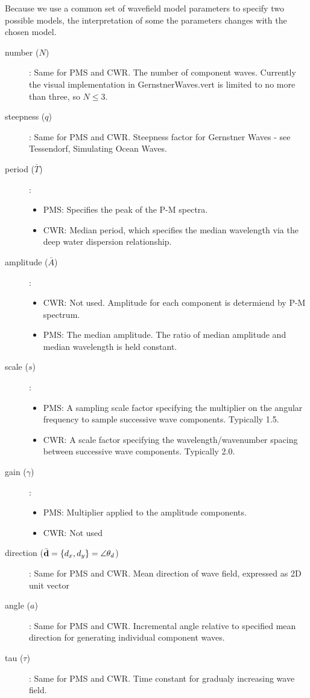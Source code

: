 \documentclass[11pt]{article}
\begin{document}
Because we use a common set of wavefield model parameters to specify two possible models, the interpretation of some the parameters changes with the chosen model.
\begin{description}
\item[number ($N$)]: Same for PMS and CWR. The number of component waves.  Currently the visual implementation in GernstnerWaves.vert is limited to no more than three, so $N \leq 3$.
\item[steepness ($q$)]: Same for PMS and CWR. Steepness factor for Gernstner Waves - see Tessendorf, Simulating Ocean Waves. 
\item[period ($\bar{T}$)]:
  \begin{itemize}
  \item PMS: Specifies the peak of the P-M spectra.
  \item CWR: Median period, which specifies the median wavelength via the deep water dispersion relationship.
  \end{itemize}
\item[amplitude ($\bar{A}$)]:
  \begin{itemize}
  \item CWR: Not used.  Amplitude for each component is determiend by P-M spectrum.
  \item PMS: The median amplitude.  The ratio of median amplitude and median wavelength is held constant.
  \end{itemize}
\item[scale ($s$)]:
  \begin{itemize}
  \item PMS: A sampling scale factor specifying the multiplier on the angular frequency to sample successive wave components.  Typically 1.5.
  \item CWR: A scale factor specifying the wavelength/wavenumber spacing between successive wave components.  Typically 2.0.
  \end{itemize}
\item[gain ($\gamma$)]:
  \begin{itemize}
  \item PMS: Multiplier applied to the amplitude components.
  \item CWR: Not used
  \end{itemize}
\item[direction ($\bar{\mbox{${\bf d}$}}=\{d_x,d_y\}=\angle{\theta_d}$)]: Same for PMS and CWR. Mean direction of wave field, expressed as 2D unit vector
\item[angle ($a$)]: Same for PMS and CWR. Incremental angle relative to specified mean direction for generating individual component waves.
\item[tau ($\tau$)]: Same for PMS and CWR.  Time constant for gradualy increasing wave field.  
\end{description}
\end{document}
